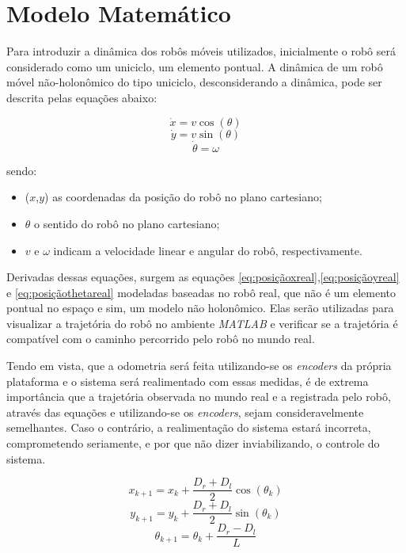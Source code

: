 \section{Modelo Matemático}
\label{sec:modMatematico}
Para introduzir a dinâmica dos robôs móveis utilizados, inicialmente o robô será considerado como um uniciclo, um elemento pontual. A dinâmica de um robô móvel não-holonômico do tipo uniciclo, desconsiderando a dinâmica, pode ser descrita pelas equações abaixo:

\begin{equation}
\dot{x} = v\cos(\theta) 
\label{eq:posiçãox}
\end{equation}
\begin{equation}
\dot{y} = v\sin(\theta)
\label{eq:posiçãoy}
\end{equation}
\begin{equation}
\dot{\theta} = \omega
\label{eq:posiçãotheta}
\end{equation}

sendo:
\begin{itemize}
	\item ($x$,$y$) as coordenadas da posição do robô no plano cartesiano;
	\item $\theta$ o sentido do robô no plano cartesiano;
	\item $v$ e $\omega$ indicam a velocidade linear e angular do robô, respectivamente.	
\end{itemize}

Derivadas dessas equações, surgem as equações \ref*{eq:posiçãoxreal},\ref*{eq:posiçãoyreal} e \ref*{eq:posiçãothetareal} modeladas baseadas no robô real, que não é um elemento pontual no espaço e sim, um modelo não holonômico. Elas serão utilizadas para visualizar a trajetória do robô no ambiente \emph{MATLAB\textregistered} e verificar se a trajetória é compatível com o caminho percorrido pelo robô no mundo real. 

Tendo em vista, que a odometria será feita utilizando-se os \emph{encoders} da própria plataforma e o sistema será realimentado com essas medidas, é de extrema importância que a trajetória observada no mundo real e a registrada pelo robô, através das equações e utilizando-se os \emph{encoders}, sejam consideravelmente semelhantes. Caso o contrário, a realimentação do sistema estará incorreta, comprometendo seriamente, e por que não dizer inviabilizando, o controle do sistema. 

\begin{equation}
x_{k+1} = x_{k} + \dfrac{D_{r} + D_{l}}{2}\cos(\theta_{k}) 
\label{eq:posiçãoxreal}
\end{equation}
\begin{equation}
y_{k+1} = y_{k} + \dfrac{D_{r} + D_{l}}{2}\sin(\theta_{k}) 
\label{eq:posiçãoyreal}
\end{equation}
\begin{equation}
\theta_{k+1} = \theta_{k} + \dfrac{D_{r} - D_{l}}{L}
\label{eq:posiçãothetareal}
\end{equation}


